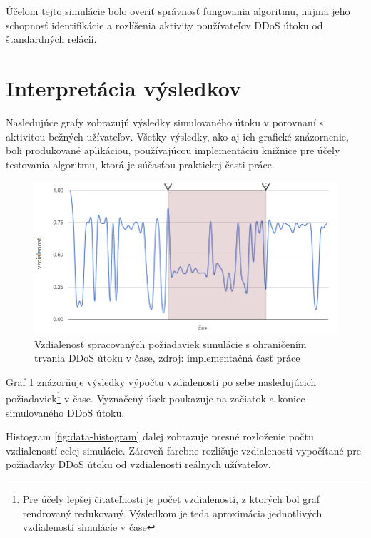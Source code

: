 \documentclass[
  digital, %
  oneside, %
  table,   %
  lof,     %
  nolot,   %
  nocover
]{fithesis3}
\begin{document}
Účelom tejto simulácie bolo overiť správnosť fungovania algoritmu, najmä jeho
schopnosť identifikácie a rozlíšenia aktivity používateľov DDoS útoku od
štandardných relácií.

\section{Interpretácia výsledkov}
Nasledujúce grafy zobrazujú výsledky simulovaného útoku v porovnaní s aktivitou
bežných užívateľov. Všetky výsledky, ako aj ich grafické znázornenie, boli
produkované aplikáciou, používajúcou implementáciu knižnice pre účely testovania
algoritmu, ktorá je súčasťou praktickej časti práce.

\begin{figure}[H]
  \centering
    \includegraphics[width=.94\textwidth]{images/data-flow-new.png}
  \caption{Vzdialenosť spracovaných požiadaviek simulácie s ohraničením trvania
  DDoS útoku v čase, zdroj: implementačná časť práce}
  \label{fig:data-flow}
\end{figure}

Graf \ref{fig:data-flow} znázorňuje výsledky výpočtu vzdialeností po sebe nasledujúcich
požiadaviek\footnote{Pre účely lepšej čitateľnosti je počet vzdialeností, z
ktorých bol graf rendrovaný redukovaný. Výsledkom je teda aproximácia
jednotlivých vzdialeností simulácie v čase} v čase. Vyznačený úsek poukazuje na
začiatok a koniec simulovaného DDoS útoku.

Histogram \ref{fig:data-histogram} ďalej zobrazuje presné rozloženie počtu
vzdialeností celej simulácie. Zároveň farebne rozlišuje vzdialenosti vypočítané
pre požiadavky DDoS útoku od vzdialeností reálnych užívateľov. 
\end{document}
